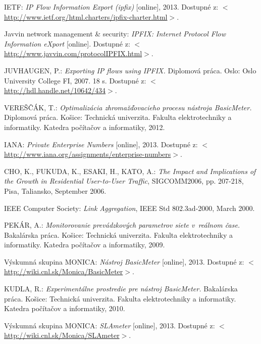 \begin{thebibliography}{999}
IETF: \emph{IP Flow Information Export (ipfix)} [online], 2013. Dostupné 
z: $<$\url{http://www.ietf.org/html.charters/ipfix-charter.html}$>$.

Javvin network management \& security: \emph{IPFIX: Internet Protocol Flow Information eXport} [online]. Dostupné 
z: $<$\url{http://www.javvin.com/protocolIPFIX.html}$>$.

JUVHAUGEN, P.: \emph{Exporting IP flows using IPFIX.} 
Diplomová práca. Oslo: Oslo University College FI, 2007. 18 s. Dostupné 
z: $<$\url{http://hdl.handle.net/10642/434}$>$.

VEREŠČÁK, T.: \emph{Optimalizácia zhromažďovacieho procesu nástroja BasicMeter.} 
Diplomová práca. Košice: Technická univerzita. Fakulta elektrotechniky a informatiky. 
Katedra počítačov a informatiky, 2012.

IANA: \emph{Private Enterprise Numbers} [online], 2013. Dostupné 
z: $<$\url{http://www.iana.org/assignments/enterprise-numbers}$>$.

CHO, K., FUKUDA, K., ESAKI, H., KATO, A.: \emph{The Impact and Implications of the Growth in Residential
User-to-User Traffic}, SIGCOMM2006, pp. 207-218, Pisa, Taliansko, September 2006.

IEEE Computer Society: \emph{Link Aggregation}, IEEE Std 802.3ad-2000, March 2000.

PEKÁR, A.: \emph{Monitorovanie prevádzkových parametrov siete v~reálnom čase.} 
Bakalárska práca. Košice: Technická univerzita. Fakulta elektrotechniky a informatiky. 
Katedra počítačov a informatiky, 2009.

Výskumná skupina MONICA: \emph{Nástroj BasicMeter} [online], 2013. 
Dostupné z: $<$\url{http://wiki.cnl.sk/Monica/BasicMeter}$>$.

KUDLA, R.: \emph{Experimentálne prostredie pre nástroj BasicMeter.} 
Bakalárska práca. Košice: Technická univerzita. Fakulta elektrotechniky a informatiky. 
Katedra počítačov a informatiky, 2010.

Výskumná skupina MONICA: \emph{SLAmeter} [online], 2013. 
Dostupné z: $<$\url{http://wiki.cnl.sk/Monica/SLAmeter}$>$.


\end{thebibliography}
